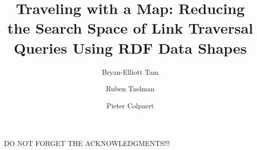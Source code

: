 \documentclass[runningheads]{llncs}
\begin{document}
%
\title{Traveling with a Map: Reducing the Search Space of Link Traversal Queries Using RDF Data Shapes}
%
%
\author{Bryan-Elliott Tam \and
Ruben Taelman \and
Pieter Colpaert}
%
%
%
\maketitle              %
%







%

DO NOT FORGET THE ACKNOWLEDGMENTS!!!

\printbibliography
\end{document}
